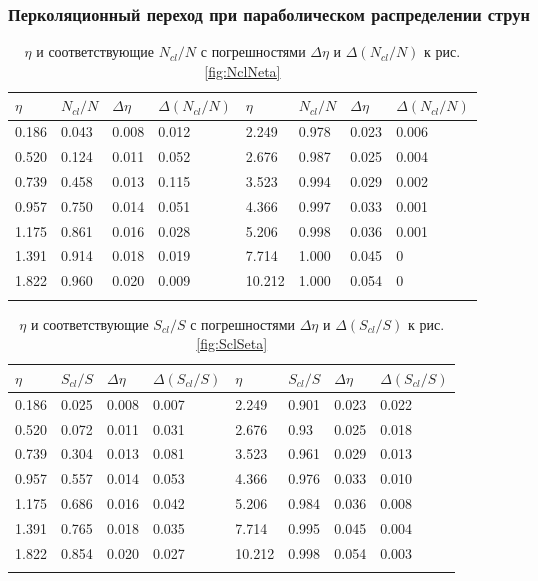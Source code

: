 \subsubsection{Перколяционный переход при параболическом распределении струн}
{\footnotesize
\begin{longtable}{| l | l | l | l || l | l | l | l |}
	\hline
	$\eta$	&	$N_{cl}/N$	&	$\Delta \eta$	&	$\Delta (N_{cl}/N)$	&	$\eta$	&	$N_{cl}/N$	&	$\Delta \eta$	&	$\Delta (N_{cl}/N)$	\\
	\hline
	0.186	&	0.043	&	0.008	&	0.012	&	2.249	&	0.978	&	0.023	&	0.006	\\
	0.520	&	0.124	&	0.011	&	0.052	&	2.676	&	0.987	&	0.025	&	0.004	\\
	0.739	&	0.458	&	0.013	&	0.115	&	3.523	&	0.994	&	0.029	&	0.002	\\
	0.957	&	0.750	&	0.014	&	0.051	&	4.366	&	0.997	&	0.033	&	0.001	\\
	1.175	&	0.861	&	0.016	&	0.028	&	5.206	&	0.998	&	0.036	&	0.001	\\
	1.391	&	0.914	&	0.018	&	0.019	&	7.714	&	1.000	&	0.045	&	0	\\
	1.822	&	0.960	&	0.020	&	0.009	&	10.212	&	1.000	&	0.054	&	0	\\
	\hline
	\caption{$\eta$ и соответствующие $N_{cl}/N$ с погрешностями $\Delta \eta$ и $\Delta (N_{cl}/N)$ к рис. \ref{fig:NclNeta}} \label{tab:NclNeta}
\end{longtable}}

{\footnotesize
\begin{longtable}{| l | l | l | l || l | l | l | l |}
	\hline
	$\eta$	&	$S_{cl}/S$	&	$\Delta \eta$	&	$\Delta (S_{cl}/S)$	&	$\eta$	&	$S_{cl}/S$	&	$\Delta \eta$	&	$\Delta (S_{cl}/S)$	\\
	\hline
	0.186	&	0.025	&	0.008	&	0.007	&	2.249	&	0.901	&	0.023	&	0.022	\\
	0.520	&	0.072	&	0.011	&	0.031	&	2.676	&	0.93	&	0.025	&	0.018	\\
	0.739	&	0.304	&	0.013	&	0.081	&	3.523	&	0.961	&	0.029	&	0.013	\\
	0.957	&	0.557	&	0.014	&	0.053	&	4.366	&	0.976	&	0.033	&	0.010	\\
	1.175	&	0.686	&	0.016	&	0.042	&	5.206	&	0.984	&	0.036	&	0.008	\\
	1.391	&	0.765	&	0.018	&	0.035	&	7.714	&	0.995	&	0.045	&	0.004	\\
	1.822	&	0.854	&	0.020	&	0.027	&	10.212	&	0.998	&	0.054	&	0.003	\\
	\hline
	\caption{$\eta$ и соответствующие $S_{cl}/S$ с погрешностями $\Delta \eta$ и $\Delta (S_{cl}/S)$ к рис. \ref{fig:SclSeta}} \label{tab:SclSeta}
\end{longtable}}

